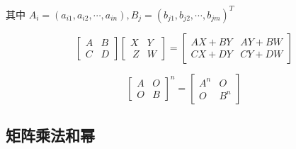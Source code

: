 \begin{definition}[重要矩阵]
\begin{itemize}
		其中 $A_{i} = (a_{i1},a_{i2},\cdots,a_{in}), B_{j} = (b_{j1},b_{j2},\cdots,b_{jm})^{T}$

		$$\begin{bmatrix}
			A & B\\
			C & D
		\end{bmatrix}
		\begin{bmatrix}
			X & Y\\\
			Z & W
		\end{bmatrix} = 
		\begin{bmatrix}
			AX+BY & AY+BW\\
			CX+DY & CY+DW
		\end{bmatrix}$$

		$$\begin{bmatrix}
			A & O\\
			O & B
		\end{bmatrix}^{n} =
		\begin{bmatrix}
			A^{n} & O\\
			O & B^{n}
		\end{bmatrix}$$
	\end{itemize}
\end{definition}

\subsection{矩阵乘法和幂}

